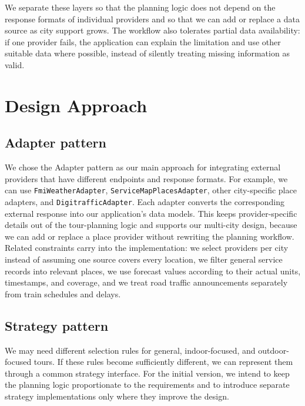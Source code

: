 \documentclass[a4paper,10pt]{article}
\begin{document}
We separate these layers so that the planning logic does not depend on the response formats of individual providers and so that we can add or replace a data source as city support grows. The workflow also tolerates partial data availability: if one provider fails, the application can explain the limitation and use other suitable data where possible, instead of silently treating missing information as valid.

\section{Design Approach}
\subsection{Adapter pattern}
We chose the Adapter pattern as our main approach for integrating external providers that have different endpoints and response formats. For example, we can use \texttt{FmiWeatherAdapter}, \texttt{ServiceMapPlacesAdapter}, other city-specific place adapters, and \texttt{DigitrafficAdapter}. Each adapter converts the corresponding external response into our application's data models. This keeps provider-specific details out of the tour-planning logic and supports our multi-city design, because we can add or replace a place provider without rewriting the planning workflow. Related constraints carry into the implementation: we select providers per city instead of assuming one source covers every location, we filter general service records into relevant places, we use forecast values according to their actual units, timestamps, and coverage, and we treat road traffic announcements separately from train schedules and delays.

\subsection{Strategy pattern}
We may need different selection rules for general, indoor-focused, and outdoor-focused tours. If these rules become sufficiently different, we can represent them through a common strategy interface. For the initial version, we intend to keep the planning logic proportionate to the requirements and to introduce separate strategy implementations only where they improve the design.
\end{document}
